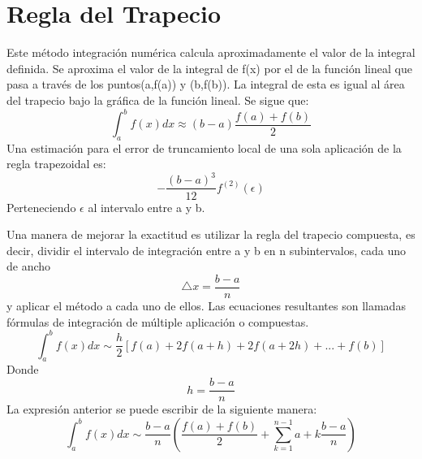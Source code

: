 


\section{Regla del Trapecio}
\label{2:sec:1}

Este método integración numérica calcula aproximadamente el valor de la integral definida. 
Se aproxima el valor de la integral de f(x) por el de la función lineal que pasa 
a través de los puntos(a,f(a)) y (b,f(b)). La integral de esta es igual al área del 
trapecio bajo la gráfica de la función lineal. Se sigue que: 
\[
\int_{a}^{b} f(x)dx \approx\left(b-a\right)\frac{f(a)+f(b)}{2} 
\]
Una estimación para el error de truncamiento local de una sola aplicación de la regla trapezoidal es:
\[
-\frac{\left(b-a\right)^3}{12}  \displaystyle f^{(2)}(\epsilon)
\]
Perteneciendo $\epsilon$ al intervalo entre a y b.


Una manera de mejorar la exactitud es utilizar la regla del trapecio compuesta, es decir, dividir
el intervalo de integración entre a y b en n subintervalos, cada uno de ancho
\[
\bigtriangleup{x}=\frac{b-a}{n}
\]
y aplicar el método a cada uno de ellos. Las ecuaciones resultantes son llamadas fórmulas
de integración de múltiple aplicación o compuestas.
\[
\int_{a}^{b} f(x)dx \sim\frac{h}{2}\left[f(a) + 2f(a+h) + 2f(a+2h) + ... + f(b)\right]
\]
Donde 
\[
h=\frac{b-a}{n} 
\]
La expresión anterior se puede escribir de la siguiente manera:
\[
\int_{a}^{b} f(x)dx \sim\frac{b-a}{n}\left(\frac{f(a)+f(b)}{2} + \sum_{k=1}^{n-1} a+k\frac{b-a}{n} \right)
\]
